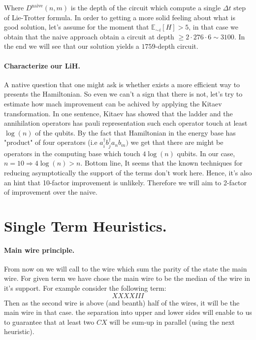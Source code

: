 \documentclass{article}
\begin{document}
\begin{multicols*}{2}
Where \( D^{\text{naive}}\left(n,m\right)\) is the depth of the circuit which compute a single \( \Delta t \) step of Lie-Trotter formula\cite{Lie-Trotter}. In order to getting a more solid feeling about what is good solution, let's assume for the moment that \( \mathbb{E}_{\sim i}[H] > 5 \), in that case we obtain that the naive approach obtain a circuit at depth \( \ge 2 \cdot 276 \cdot 6 \sim 3100 \). In the end we will see that our solution yields a \(1759\)-depth circuit. 

\paragraph{Characterize our \textbf{LiH}.} A native question that one might ask is whether exists a more efficient way to presents the Hamiltonian. So even we can't a sign that there is not, let's try to estimate how mach improvement can be achived by applying the Kitaev transformation. In one sentence, Kitaev has showed that the ladder and the annihilation operators has pauli representation such each operator touch at least \( \log\left(n\right) \) of the qubits. By the fact that Hamiltonian in the energy base has "product" of four operators (i.e \( a^{\dagger}_{i}b^{\dagger}_{j}a_{n}b_{m}) \) we get that there are might be operators in the computing base which touch \(4\log\left(n\right)\) qubits. In our case, \(n = 10 \Rightarrow 4\log\left(n\right) > n \). 
Bottom line, It seems that the known techniques for reducing asymptotically the support of the terms don't work here. Hence, it's also an hint that 10-factor improvement is unlikely. Therefore we will aim to 2-factor of improvement over the naive.    

\section{Single Term Heuristics.}

\paragraph{Main wire principle.} From now on we will call to the wire which sum the parity of the state the main wire. For given term we have chose the main wire to be the median of the wire in it's support. For example consider the following term:
\begin{equation*}
    XXXXIII
\end{equation*} 
Then as the second wire is above (and beanth) half of the wires, it will be the main wire in that case. the separation into upper and lower sides will enable to us to guarantee that at least two \(CX\) will be sum-up in parallel (using the next heuristic).

\end{multicols*}
\end{document}
